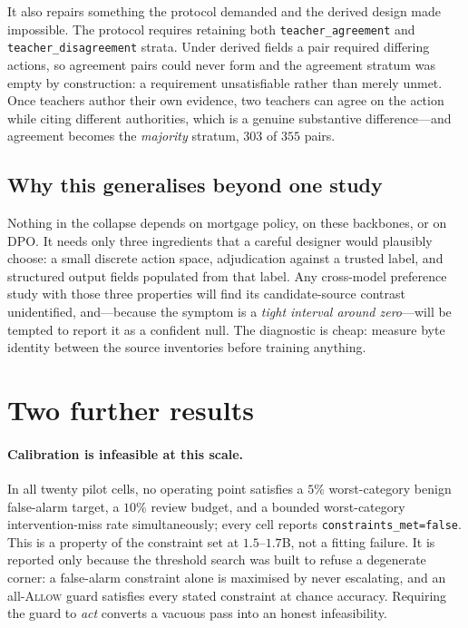 \documentclass[10pt]{article}
\newcommand{\allow}{\textsc{Allow}}
\begin{document}
It also repairs something the protocol demanded and the derived design made impossible.
The protocol requires retaining both \texttt{teacher\_agreement} and
\texttt{teacher\_disagreement} strata. Under derived fields a pair required differing
actions, so agreement pairs could never form and the agreement stratum was empty by
construction: a requirement unsatisfiable rather than merely unmet. Once teachers author
their own evidence, two teachers can agree on the action while citing different
authorities, which is a genuine substantive difference---and agreement becomes the
\emph{majority} stratum, $303$ of $355$ pairs.

\subsection{Why this generalises beyond one study}

Nothing in the collapse depends on mortgage policy, on these backbones, or on DPO. It
needs only three ingredients that a careful designer would plausibly choose: a small
discrete action space, adjudication against a trusted label, and structured output
fields populated from that label. Any cross-model preference study with those three
properties will find its candidate-source contrast unidentified, and---because the
symptom is a \emph{tight interval around zero}---will be tempted to report it as a
confident null. The diagnostic is cheap: measure byte identity between the source
inventories before training anything.

\section{Two further results}

\paragraph{Calibration is infeasible at this scale.}
In all twenty pilot cells, no operating point satisfies a $5\%$ worst-category benign
false-alarm target, a $10\%$ review budget, and a bounded worst-category
intervention-miss rate simultaneously; every cell reports
\texttt{constraints\_met=false}. This is a property of the constraint set at
$1.5$--$1.7$B, not a fitting failure. It is reported only because the threshold search
was built to refuse a degenerate corner: a false-alarm constraint alone is maximised by
never escalating, and an all-\allow{} guard satisfies every stated constraint at chance
accuracy. Requiring the guard to \emph{act} converts a vacuous pass into an honest
infeasibility.
\end{document}
